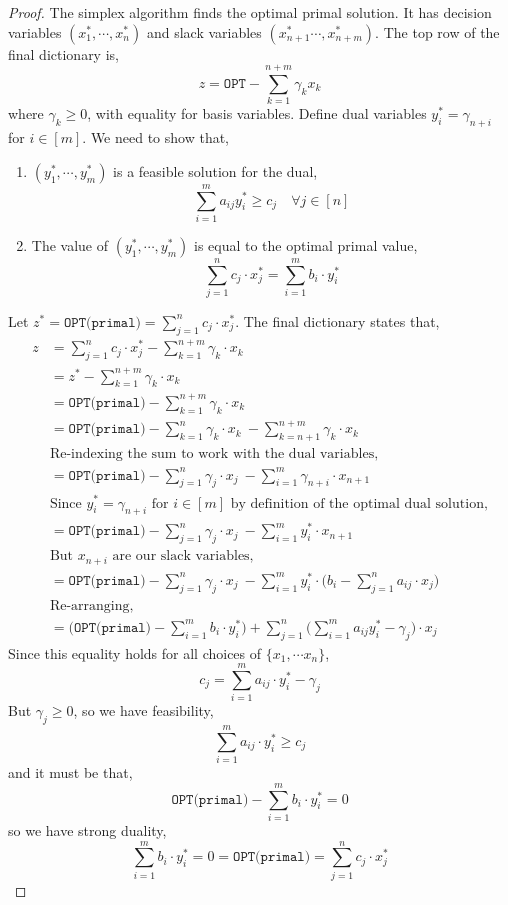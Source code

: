 	\begin{proof}
		The simplex algorithm finds the optimal primal solution. It has decision variables $(x_1^*, \cdots, x_n^*)$ and slack variables $(x_{n+1}^* \cdots, x_{n+m}^*)$. The top row of the final dictionary is,
		\[z = \texttt{OPT} - \sum_{k=1}^{n+m} \gamma_k x_k\]
		\noindent where $\gamma_k \geq 0$, with equality for basis variables. Define dual variables $y_i^* = \gamma_{n+i}$ for $i \in [m]$. We need to show that,
		\begin{enumerate}
			\item $(y_1^*, \cdots, y_m^*)$ is a feasible solution for the dual,
		\[\sum_{i=1}^m a_{ij}y_i^* \geq c_j \quad \forall j \in [n]\]
			\item The value of $(y_1^*, \cdots, y_m^*)$ is equal to the optimal primal value,
			\[\sum_{j=1}^{n} c_{j} \cdot x_{j}^{*}=\sum_{i=1}^{m} b_{i} \cdot y_{i}^{*}\]
		\end{enumerate}
		\noindent  Let $z^* = \texttt{OPT(primal)} = \sum_{j=1}^n c_j \cdot x_j^*$. The final dictionary states that,
		\begin{align*}
			z &= \sum_{j=1}^n c_j \cdot x_j^* - \sum_{k=1}^{n+m} \gamma_k \cdot x_k \\
			  &= z^* - \sum_{k=1}^{n+m} \gamma_k \cdot x_k \\
			  &= \texttt{OPT(primal)} - \sum_{k=1}^{n+m} \gamma_k \cdot x_k \\
			  &= \texttt{OPT(primal)} - \sum_{k=1}^{n} \gamma_k \cdot x_k \ - \sum_{k=n+1}^{n+m} \gamma_k \cdot x_k \\
			  &\text{Re-indexing the sum to work with the dual variables,} \\
			  &= \texttt{OPT(primal)} - \sum_{j=1}^{n} \gamma_j \cdot x_j \ - \sum_{i=1}^{m} \gamma_{n+i} \cdot x_{n+1} \\
			  &\text{Since $y_i^* = \gamma_{n+i}$ for $i \in [m]$ by definition of the optimal dual solution,} \\
			  &= \texttt{OPT(primal)} - \sum_{j=1}^{n} \gamma_j \cdot x_j \ - \sum_{i=1}^{m} y_i^* \cdot x_{n+1} \\
			  &\text{But $x_{n+i}$ are our slack variables,} \\
			  &= \texttt{OPT(primal)} - \sum_{j=1}^{n} \gamma_j \cdot x_j \ - \sum_{i=1}^{m} y_i^* \cdot \bigg(b_i - \sum_{j=1}^n a_{ij} \cdot x_j\bigg) \\
			  &\text{Re-arranging,} \\
			  &= \bigg(\texttt{OPT(primal)} - \sum_{i=1}^m b_i \cdot y_i^*\bigg) + \sum_{j=1}^n \bigg(\sum_{i=1}^m a_{ij}y_i^* - \gamma_j\bigg) \cdot x_j
		\end{align*}
		\noindent Since this equality holds for all choices of $\{x_1, \cdots x_n\}$,
		\[c_j = \sum_{i=1}^m a_{ij} \cdot y_i^* - \gamma_j\]
		\noindent But $\gamma_j \geq 0$, so we have feasibility,
		\[\sum_{i=1}^m a_{ij} \cdot y_i^* \geq c_j\]
		\noindent and it must be that,
		\[\texttt{OPT(primal)} - \sum_{i=1}^m b_i \cdot y_i^* = 0\]
		\noindent so we have strong duality,
		\[\sum_{i=1}^{m} b_{i} \cdot y_{i}^{*}=0 = \texttt{OPT(primal)}=\sum_{j=1}^{n} c_{j} \cdot x_{j}^{*}\]
	\end{proof}
	
